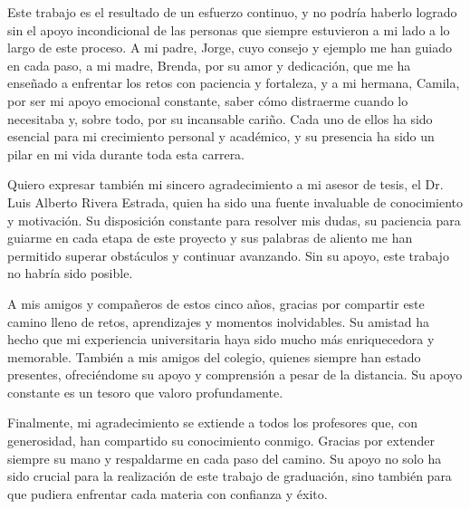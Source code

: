 Este trabajo es el resultado de un esfuerzo continuo, y no podría haberlo logrado sin el apoyo incondicional de las personas que siempre estuvieron a mi lado a lo largo de este proceso. A mi padre, Jorge, cuyo consejo y ejemplo me han guiado en cada paso, a mi madre, Brenda, por su amor y dedicación, que me ha enseñado a enfrentar los retos con paciencia y fortaleza, y a mi hermana, Camila, por ser mi apoyo emocional constante, saber cómo distraerme cuando lo necesitaba y, sobre todo, por su incansable cariño. Cada uno de ellos ha sido esencial para mi crecimiento personal y académico, y su presencia ha sido un pilar en mi vida durante toda esta carrera.

Quiero expresar también mi sincero agradecimiento a mi asesor de tesis, el Dr. Luis Alberto Rivera Estrada, quien ha sido una fuente invaluable de conocimiento y motivación. Su disposición constante para resolver mis dudas, su paciencia para guiarme en cada etapa de este proyecto y sus palabras de aliento me han permitido superar obstáculos y continuar avanzando. Sin su apoyo, este trabajo no habría sido posible.

A mis amigos y compañeros de estos cinco años, gracias por compartir este camino lleno de retos, aprendizajes y momentos inolvidables. Su amistad ha hecho que mi experiencia universitaria haya sido mucho más enriquecedora y memorable. También a mis amigos del colegio, quienes siempre han estado presentes, ofreciéndome su apoyo y comprensión a pesar de la distancia. Su apoyo constante es un tesoro que valoro profundamente.

Finalmente, mi agradecimiento se extiende a todos los profesores que, con generosidad, han compartido su conocimiento conmigo. Gracias por extender siempre su mano y respaldarme en cada paso del camino. Su apoyo no solo ha sido crucial para la realización de este trabajo de graduación, sino también para que pudiera enfrentar cada materia con confianza y éxito.